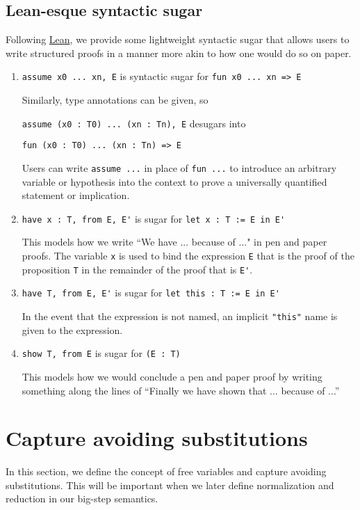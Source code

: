 \documentclass{article}
\begin{document}
\subsection{Lean-esque syntactic sugar}
Following \href{https://leanprover.github.io/reference/expressions.html#structured-proofs}
{Lean}, we provide some lightweight syntactic sugar that allows users to write
structured proofs in a manner more akin to how one would do so on paper.

\begin{enumerate}
  \item \verb|assume x0 ... xn, E| is syntactic sugar for \verb|fun x0 ... xn => E| 

  Similarly, type annotations can be given, so

  \verb|assume (x0 : T0) ... (xn : Tn), E| desugars into 
  
  \verb|fun (x0 : T0) ... (xn : Tn) => E|

  Users can write \verb|assume ...| in place of \verb|fun ...| to introduce an 
  arbitrary variable or hypothesis into the context to prove a universally
  quantified statement or implication.

  \item \verb|have x : T, from E, E'| is sugar for \verb|let x : T := E in E'|

  This models how we write ``We have ... because of ..." in pen and paper proofs.
  The variable \verb|x| is used to bind the expression \verb|E| that is the proof
  of the proposition \verb|T| in the remainder of the proof that is \verb|E'|. 

  \item \verb|have T, from E, E'| is sugar for \verb|let this : T := E in E'|

  In the event that the expression is not named, an implicit \verb|"this"| name is
  given to the expression.

  \item \verb|show T, from E| is sugar for \verb|(E : T)|

  This models how we would conclude a pen and paper proof by writing something
  along the lines of ``Finally we have shown that ... because of ...'' 
\end{enumerate}


\section{Capture avoiding substitutions}
In this section, we define the concept of free variables and capture avoiding
substitutions. This will be important when we later define normalization and
reduction in our big-step semantics.
\end{document}
